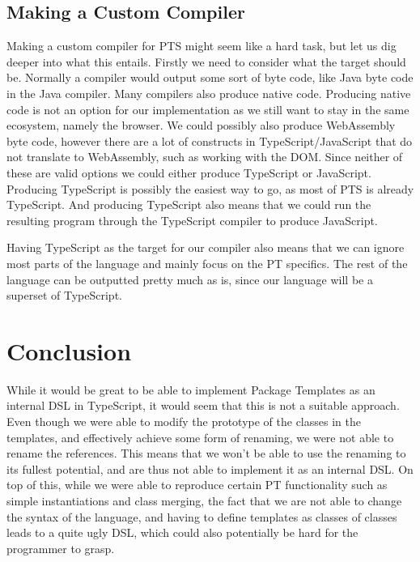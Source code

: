 \subsection{Making a Custom Compiler}\label{subsec:making-a-custom-compiler}


Making a custom compiler for PTS might seem like a hard task, but let us dig deeper into what this entails.
Firstly we need to consider what the target should be.
Normally a compiler would output some sort of byte code, like Java byte code in the Java compiler.
Many compilers also produce native code.
Producing native code is not an option for our implementation as we still want to stay in the same ecosystem, namely the browser.
We could possibly also produce WebAssembly byte code, however there are a lot of constructs in TypeScript/JavaScript that do not translate to WebAssembly, such as working with the DOM\@.
Since neither of these are valid options we could either produce TypeScript or JavaScript.
Producing TypeScript is possibly the easiest way to go, as most of PTS is already TypeScript.
And producing TypeScript also means that we could run the resulting program through the TypeScript compiler to produce JavaScript.

Having TypeScript as the target for our compiler also means that we can ignore most parts of the language and mainly focus on the PT specifics.
The rest of the language can be outputted pretty much as is, since our language will be a superset of TypeScript.


\section{Conclusion}\label{sec:planning-conclusion}


While it would be great to be able to implement Package Templates as an internal DSL in TypeScript, it would seem that this is not a suitable approach.
Even though we were able to modify the prototype of the classes in the templates, and effectively achieve some form of renaming, we were not able to rename the references.
This means that we won't be able to use the renaming to its fullest potential, and are thus not able to implement it as an internal DSL\@.
On top of this, while we were able to reproduce certain PT functionality such as simple instantiations and class merging, the fact that we are not able to change the syntax of the language, and having to define templates as classes of classes leads to a quite ugly DSL, which could also potentially be hard for the programmer to grasp.

